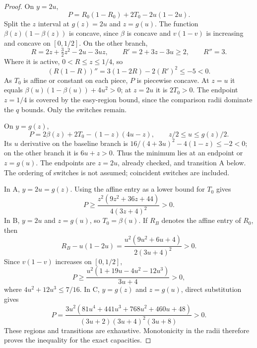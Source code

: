 \begin{proof}
On $y=2u$,
\[
 P=R_0(1-R_0)+2T_0-2u(1-2u).
\]
Split the $z$ interval at $g(z)=2u$ and $z=g(u)$.
The function $\beta(z)(1-\beta(z))$ is concave, since $\beta$ is concave
and $v(1-v)$ is increasing and concave on $[0,1/2]$.
On the other branch,
\[
 R=2z+\tfrac32z^2-2u-3uz,\qquad R'=2+3z-3u\ge2,\qquad R''=3.
\]
Where it is active, $0<R\le z\le1/4$, so
\[
 (R(1-R))''=3(1-2R)-2(R')^2\le-5<0.
\]
As $T_0$ is affine or constant on each piece, $P$ is piecewise concave.
At $z=u$ it equals $\beta(u)(1-\beta(u))+4u^2>0$; at $z=2u$ it
is $2T_0>0$. The endpoint $z=1/4$ is covered by the easy-region bound,
since the comparison radii dominate the $q$ bounds. Only the switches remain.

On $y=g(z)$,
\[
 P=2\beta(z)+2T_0-(1-z)(4u-z),\qquad z/2\le u\le g(z)/2.
\]
Its $u$ derivative on the baseline branch is
$16/(4+3u)^2-4(1-z)\le-2<0$; on the other branch it is $6u+z>0$.
Thus the minimum lies at an endpoint or $z=g(u)$. The endpoints are
$z=2u$, already checked, and transition A below. The ordering of switches
is not assumed; coincident switches are included.

In A, $y=2u=g(z)$. Using the affine entry as a lower bound for $T_0$ gives
\[
 P\ge\frac{z^2(9z^2+36z+44)}{4(3z+4)^2}>0.
\]
In B, $y=2u$ and $z=g(u)$, so $T_0=\beta(u)$. If $R_B$ denotes the
affine entry of $R_0$, then
\[
 R_B-u(1-2u)=\frac{u^2(9u^2+6u+4)}{2(3u+4)^2}>0.
\]
Since $v(1-v)$ increases on $[0,1/2]$,
\[
 P\ge\frac{u^2(1+19u-4u^2-12u^3)}{3u+4}>0,
\]
where $4u^2+12u^3\le7/16$.
In C, $y=g(z)$ and $z=g(u)$, direct substitution gives
\[
 P=\frac{3u^2(81u^4+441u^3+768u^2+460u+48)}
 {(3u+2)(3u+4)^2(3u+8)}>0.
\]
These regions and transitions are exhaustive. Monotonicity in the radii
therefore proves the inequality for the exact capacities.
\end{proof}
